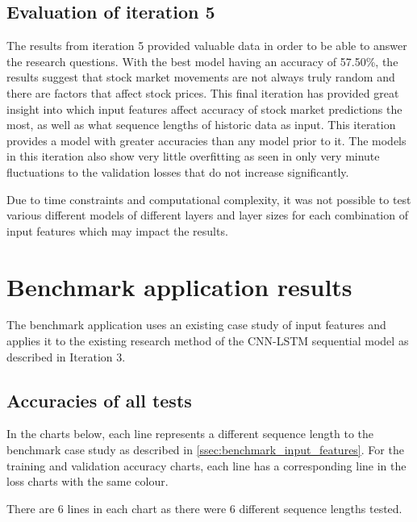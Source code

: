 \subsection{Evaluation of iteration 5}
The results from iteration 5 provided valuable data in order to be able to answer the research questions. With the best model having an accuracy
of 57.50\%, the results suggest that stock market movements are not always truly random and there are factors that affect stock prices. This
final iteration has provided great insight into which input features affect accuracy of stock market predictions the most, as well as what
sequence lengths of historic data as input. This iteration provides a model with greater accuracies than any model prior to it. The models in this
iteration also show very little overfitting as seen in only very minute fluctuations to the validation losses that do not increase significantly.

Due to time constraints and computational complexity, it was not possible to test various different models of different layers and layer sizes
for each combination of input features which may impact the results.

\section{Benchmark application results}\label{benchmark_results}
The benchmark application uses an existing case study of input features and applies it to the existing research method of the CNN-LSTM sequential
model as described in Iteration 3.

\subsection{Accuracies of all tests}
In the charts below, each line represents a different sequence length to the benchmark case study as described in \autoref{ssec:benchmark_input_features}.
For the training and validation accuracy charts, each line has a corresponding line in the loss charts with the same colour.

There are 6 lines in each chart as there were 6 different sequence lengths tested.
